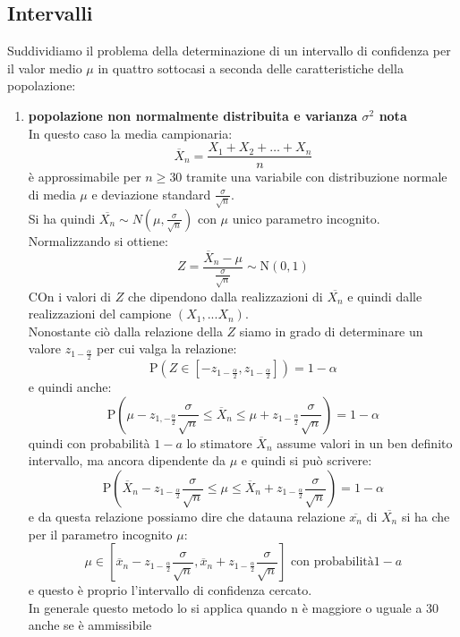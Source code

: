 \documentclass[a4paper,12pt, oneside]{book}
\begin{document}
\subsection{Intervalli }
Suddividiamo il problema della determinazione di un intervallo di confidenza per il
valor medio $\mu$ in quattro sottocasi a seconda delle caratteristiche della popolazione:
\begin{enumerate}
\item \textbf{popolazione non normalmente distribuita e varianza $\sigma^2$ nota}
  \\ In questo caso la media campionaria:
  \[\overline{X}_{n}=\frac{X_{1}+X_{2}+\ldots+X_{n}}{n}\]
  è approssimabile per $n\geq 30$ tramite una variabile con distribuzione normale di media $\mu$ e deviazione standard $\frac{\sigma}{\sqrt{n}}$.\\
  Si ha quindi $\overline{X_n}\sim N\left(\mu, \frac{\sigma}{\sqrt{n}}\right)$ con $\mu$ unico parametro incognito.\\
  Normalizzando si ottiene:
  \[Z=\frac{\overline{X}_{n}-\mu}{\frac{\sigma}{\sqrt{n}}} \sim \mathrm{N}(0,1)\]
  COn i valori di $Z$ che dipendono dalla realizzazioni di $\overline{X_n}$ e quindi dalle realizzazioni del campione $(X_1,...X_n)$.\\
  Nonostante ciò dalla relazione della $Z$ siamo in grado di determinare un valore $z_{1-\frac{\alpha}{2}}$ per cui valga la relazione:
  \[\mathrm{P}\left(Z \in\left[-z_{1-\frac{\alpha}{2}}, z_{1-\frac{\alpha}{2}}\right]\right)=1-\alpha\]
  e quindi anche:
  \[\mathrm{P}\left(\mu-z_{1,-\frac{\alpha}{2}} \frac{\sigma}{\sqrt{n}} \leq \overline{X}_{n} \leq \mu+z_{1-\frac{\alpha}{2}} \frac{\sigma}{\sqrt{n}}\right)=1-\alpha\]
  quindi con probabilità $1-a$ lo stimatore $\overline{X}_n$ assume valori in un ben definito intervallo, ma ancora dipendente da $\mu$ e quindi si può scrivere:
  \[\mathrm{P}\left(\overline{X}_{n}-z_{1-\frac{\alpha}{2}} \frac{\sigma}{\sqrt{n}} \leq \mu \leq \overline{X}_{n}+z_{1-\frac{\alpha}{2}} \frac{\sigma}{\sqrt{n}}\right)=1-\alpha\]
  e da questa relazione possiamo dire che datauna relazione $\overline{x_n}$ di $\overline{X_n}$ si ha che per il parametro incognito $\mu$:
  \[\mu\in \left[\overline{x}_{n}-z_{1-\frac{\alpha}{2}} \frac{\sigma}{\sqrt{n}}, \overline{x}_{n}+z_{1-\frac{\alpha}{2}} \frac{\sigma}{\sqrt{n}}\right]\mbox{ con probabilità} 1-a\]
  e questo è proprio l’intervallo di confidenza cercato.\\
  In generale questo metodo lo si applica quando n è maggiore o uguale a 30 anche se è ammissibile

\end{enumerate}
\end{document}
